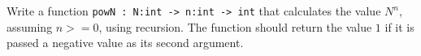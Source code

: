 Write a function \lstinline{powN : N:int -> n:int -> int} that calculates the
value $N^n$, assuming $n >= 0$, using recursion. The function should
return the value $1$ if it is passed a negative value as its second argument.
